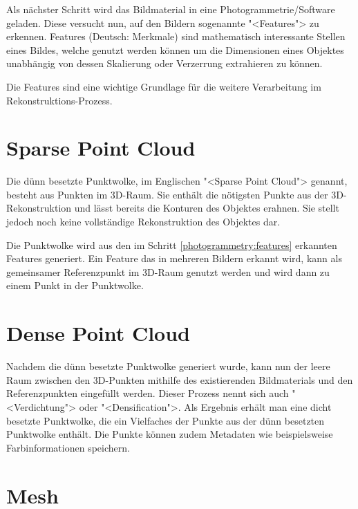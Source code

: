 Als nächster Schritt wird das Bildmaterial in eine Photogrammetrie\-/Software
geladen. Diese versucht nun, auf den Bildern sogenannte "<Features"> zu
erkennen. Features (Deutsch: Merkmale) sind mathematisch interessante Stellen
eines Bildes, welche genutzt werden können um die Dimensionen eines Objektes
unabhängig von dessen Skalierung oder Verzerrung extrahieren zu können.

Die Features sind eine wichtige Grundlage für die weitere Verarbeitung im
Rekonstruktions-Prozess.


\section{Sparse Point Cloud}

Die dünn besetzte Punktwolke, im Englischen "<Sparse Point Cloud"> genannt,
besteht aus Punkten im 3D-Raum. Sie enthält die nötigsten Punkte aus der
3D-Rekonstruktion und lässt bereits die Konturen des Objektes erahnen. Sie
stellt jedoch noch keine vollständige Rekonstruktion des Objektes dar.

Die Punktwolke wird aus den im Schritt \ref{photogrammetry:features} erkannten
Features generiert. Ein Feature das in mehreren Bildern erkannt wird, kann als
gemeinsamer Referenzpunkt im 3D-Raum genutzt werden und wird dann zu einem Punkt
in der Punktwolke.


\section{Dense Point Cloud}

Nachdem die dünn besetzte Punktwolke generiert wurde, kann nun der leere Raum
zwischen den 3D-Punkten mithilfe des existierenden Bildmaterials und den
Referenzpunkten eingefüllt werden. Dieser Prozess nennt sich auch
"<Verdichtung"> oder "<Densification">. Als Ergebnis erhält man eine dicht
besetzte Punktwolke, die ein Vielfaches der Punkte aus der dünn besetzten
Punktwolke enthält. Die Punkte können zudem Metadaten wie beispielsweise
Farbinformationen speichern.


\section{Mesh}


